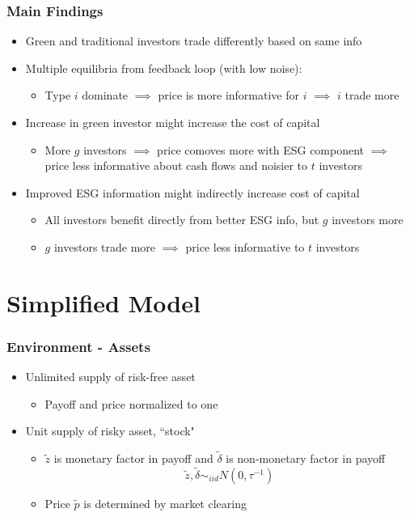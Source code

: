 \documentclass{beamer}
\begin{document}
\begin{frame}
\frametitle{Main Findings}
\begin{itemize}[<+->]
\item Green and traditional investors trade differently based on same info
\bigskip
\item Multiple equilibria from feedback loop (with low noise):
\begin{itemize}[<+->]
\item Type $i$ dominate $\implies$ price is more informative for $i$ $\implies$ $i$ trade more
\end{itemize}
\bigskip
\item Increase in green investor might increase the cost of capital
\begin{itemize}[<+->]
\item More $g$ investors $\implies$ price comoves more with ESG component $\implies$ price less informative about cash flows and noisier to $t$ investors
\end{itemize}
\bigskip
\item Improved ESG information might indirectly increase cost of capital
\begin{itemize}[<+->]
\item All investors benefit directly from better ESG info, but $g$ investors more
\item $g$ investors trade more $\implies$ price less informative to $t$ investors
\end{itemize}
\end{itemize}
\end{frame}


\section{Simplified Model}

\begin{frame}
\frametitle{Environment - Assets}
\begin{itemize}[<+->]
\item Unlimited supply of risk-free asset
\begin{itemize}[<+->]
\item Payoff and price normalized to one
\end{itemize}
\bigskip
\item Unit supply of risky asset, ``stock"
\begin{itemize}[<+->]
\item $\tilde z$ is monetary factor in payoff and $\tilde \delta$ is non-monetary factor in payoff
$$
\tilde z, \tilde \delta \sim_{iid} N(0, \tau^{-1})
$$
\item Price $\tilde p$ is determined by market clearing
\end{itemize}
\end{itemize}
\end{frame}
\end{document}
